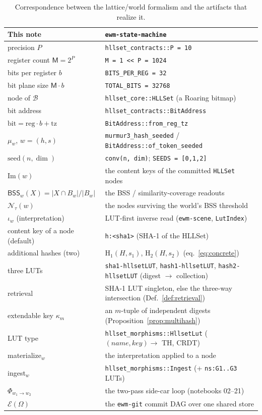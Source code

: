 \documentclass[11pt,a4paper]{article}
\theoremstyle{remark}
\newcommand{\Reg}{\ensuremath{\mathsf{M}}}          %
\newcommand{\Prec}{\ensuremath{P}}                  %
\newcommand{\Bits}{\ensuremath{b}}                  %
\newcommand{\Lat}{\ensuremath{\mathcal{B}}}         %
\newcommand{\muw}{\ensuremath{\mu_{w}}}             %
\newcommand{\Img}{\ensuremath{\mathrm{Im}}}         %
\newcommand{\iotaw}{\ensuremath{\iota_{w}}}         %
\newcommand{\Bnd}{\ensuremath{\Phi}}                %
\begin{document}
\begin{table}[t]
\centering
\small
\begin{tabular}{@{}p{}p{}@{}}
\toprule
This note & \texttt{ewm-state-machine} \\
\midrule
precision $\Prec$ & \texttt{hllset\_contracts::P = 10} \\
register count $\Reg=2^{\Prec}$ & \texttt{M = 1 << P = 1024} \\
bits per register $\Bits$ & \texttt{BITS\_PER\_REG = 32} \\
bit plane size $\Reg\cdot\Bits$ & \texttt{TOTAL\_BITS = 32768} \\
node of $\Lat$ & \texttt{hllset\_core::HLLSet} (a Roaring bitmap) \\
bit address & \texttt{hllset\_contracts::BitAddress} \\
$\mathrm{bit}=\mathrm{reg}\cdot\Bits+\mathrm{tz}$ & \texttt{BitAddress::from\_reg\_tz} \\
$\muw$, $w=(h,s)$ & \texttt{murmur3\_hash\_seeded} / \texttt{BitAddress::of\_token\_seeded} \\
$\mathrm{seed}(n,\dim)$ & \texttt{conv(n, dim)}; \texttt{SEEDS = [0,1,2]} \\
$\Img(w)$ & the content keys of the committed \texttt{HLLSet} nodes \\
$\mathsf{BSS}_w(X)=|X\cap B_w|/|B_w|$ & the BSS / similarity-coverage readouts \\
$\mathcal{N}_\tau(w)$ & the nodes surviving the world's BSS threshold \\
$\iotaw$ (interpretation) & LUT-first inverse read (\texttt{ewm-scene}, \texttt{LutIndex}) \\
content key of a node (default) & \texttt{h:\textless sha1\textgreater} (SHA-1 of the HLLSet) \\
additional hashes (two) & $\mathrm{H}_1(H,s_1)$, $\mathrm{H}_2(H,s_2)$ (eq.~\eqref{eq:concrete}) \\
three LUTs & \texttt{sha1-hllsetLUT}, \texttt{hash1-hllsetLUT}, \texttt{hash2-hllsetLUT} (digest $\to$ collection) \\
retrieval & SHA-1 LUT singleton, else the three-way intersection (Def.~\ref{def:retrieval}) \\
extendable key $\kappa_m$ & an $m$-tuple of independent digests (Proposition~\ref{prop:multihash}) \\
LUT type & \texttt{hllset\_morphisms::HllsetLut} ($(\textit{name},\textit{key})\to$ TH, CRDT) \\
materialize$_{w}$ & the interpretation applied to a node \\
ingest$_{w}$ & \texttt{hllset\_morphisms::Ingest} (+ \texttt{ns:G1..G3} LUTs) \\
$\Bnd_{w_1\to w_2}$ & the two-pass side-car loop (notebooks 02--21) \\
$\mathcal{E}(\Omega)$ & the \texttt{ewm-git} commit DAG over one shared store \\
\bottomrule
\end{tabular}
\caption{Correspondence between the lattice/world formalism and the artifacts
that realize it.}
\label{tab:corr}
\end{table}
\end{document}
